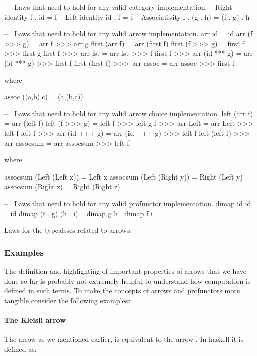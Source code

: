 \begin{code}
\begin{haskellcode}
-- | Laws that need to hold for any valid category implementation.
-- Right identity
f . id = f
-- Left identity
id . f = f
-- Associativity
f . (g . h) = (f . g) . h


-- | Laws that need to hold for any valid arrow implementation.
arr id = id
arr (f >>> g) = arr f >>> arr g
first (arr f) = arr (first f)
first (f >>> g) = first f >>> first g
first f >>> arr fst = arr fst >>> f
first f >>> arr (id *** g) = arr (id *** g) >>> first f
first (first f) >>> arr assoc = arr assoc >>> first f

where

assoc ((a,b),c) = (a,(b,c))

-- | Laws that need to hold for any valid arrow choice implementation.
left (arr f) = arr (left f)
left (f >>> g) = left f >>> left g
f >>> arr Left = arr Left >>> left f
left f >>> arr (id +++ g) = arr (id +++ g) >>> left f
left (left f) >>> arr assocsum = arr assocsum >>> left f

where

assocsum (Left (Left x)) = Left x
assocsum (Left (Right y)) = Right (Left y)
assocsum (Right z) = Right (Right z)

-- | Laws that need to hold for any valid profunctor implementation.
dimap id id ≡ id
dimap (f . g) (h . i) ≡ dimap g h . dimap f i
\end{haskellcode}
  \caption{\label{lst:arrow_laws}Laws for the typcalsses related to
    arrows.}
\end{code}

\subsubsection{Examples}
The definition and highlighting of important properties of arrows that
we have done so far is probably not extremely helpful to understand
how computation is defined in such terms. To make the concepts of
arrows and profunctors more tangible consider the following examples:

\paragraph{The Kleisli arrow}

The  arrow \cite{dawsonCompoundMonadsKleisli2007} as we
mentioned earlier, is equivalent to the arrow . In haskell it is defined as:

